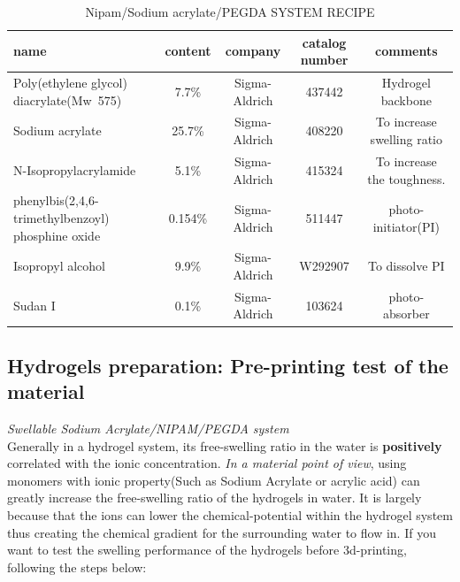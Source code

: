 \documentclass[a4paper]{article}
\begin{document}
\begin{itemize}
  \begin{table}
    \begin{center}
      \begin{tabular}{ |p{5cm}| c | c | c | c |}
        \hline
        \textbf{name}&\textbf{content}&\textbf{company}&\textbf{catalog number}&\textbf{comments} \\ 
        \hline
        Poly(ethylene glycol) diacrylate(Mw~575)&7.7\%&Sigma-Aldrich&437442& Hydrogel backbone\\     
        \hline
        Sodium acrylate&25.7\%&Sigma-Aldrich&408220&To increase swelling ratio\\ 
        \hline
        N-Isopropylacrylamide&5.1\%&Sigma-Aldrich&415324&To increase the toughness.\\ 
        \hline
        phenylbis(2,4,6-trimethylbenzoyl) phosphine oxide&0.154\%&Sigma-Aldrich&511447&photo-initiator(PI)\\
        \hline
        Isopropyl alcohol&9.9\%&Sigma-Aldrich&W292907&To dissolve PI\\      
        \hline
        Sudan I&0.1\%&Sigma-Aldrich&103624&photo-absorber \\
        \hline
      \end{tabular}
      \caption{Nipam/Sodium acrylate/PEGDA SYSTEM RECIPE}
    \end{center}
  \end{table}
  \pagebreak
  \subsection{Hydrogels preparation: Pre-printing test of the material}
  \textit{\textit{Swellable} Sodium Acrylate/NIPAM/PEGDA system}\\
  Generally in a hydrogel system, its free-swelling ratio in the water is \textbf{positively} correlated with the ionic 
  concentration. \textit{In a material point of view}, using monomers with ionic property(Such as Sodium Acrylate or 
  acrylic acid) can greatly increase the free-swelling ratio of the hydrogels in water. It is largely because that the 
  ions can lower the chemical-potential within the hydrogel system thus creating the chemical gradient for the surrounding 
  water to flow in. If you want to test the swelling performance of the hydrogels before 3d-printing, following the steps 
  below:
  

\end{itemize}
\end{document}
